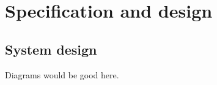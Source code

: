 \chapter{Specification and design}
\label{ch:specification}


\section{System design}

Diagrams would be good here.

